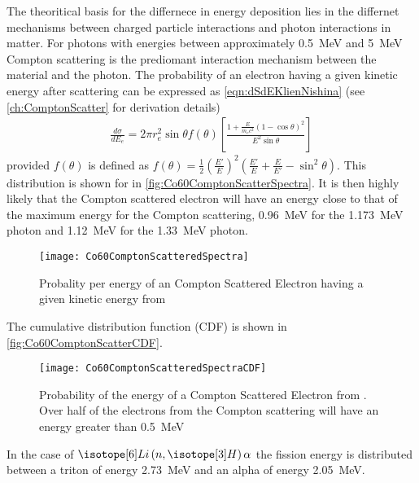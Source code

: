The theoritical basis for the differnece in energy deposition lies in the differnet mechanisms between charged particle interactions and photon interactions in matter.
For photons with energies between approximately \SI{0.5}{\MeV} and \SI{5}{\MeV} Compton scattering is the prediomant interaction mechanism between the material and the photon.
The probability of an electron having a given kinetic energy after scattering can be expressed as \autoref{eqn:dSdEKlienNishina} (see \autoref{ch:ComptonScatter} for derivation details)
\begin{align}
  \label{eqn:dSdEKleinNishina}
\frac{d\sigma}{dE_e} = 2\pi r_e^2 \sin \theta f(\theta)\left [ \frac{1+\frac{E}{m_e c^2}\left(1-\cos\theta \right)^2}{E^2 \sin \theta} \right ]
\end{align}
provided  $f(\theta)$ is defined as $f(\theta) = \frac{1}{2}\left(\frac{E'}{E}\right)^2 \left(\frac{E'}{E} + \frac{E}{E'}-\sin^2\theta\right)$.
This distribution is shown for  in \autoref{fig:Co60ComptonScatterSpectra}.
It is then highly likely that the Compton scattered electron will have an energy close to that of the maximum energy for the Compton scattering, \SI{0.96}{\MeV} for the \SI{1.173}{\MeV} photon and \SI{1.12}{\MeV} for the \SI{1.33}{\MeV} photon.
\begin{figure}
  \centering
  \texttt{[image: Co60ComptonScatteredSpectra]}
  \caption[Gamma (Co-60) Compton Scattered Spectra]{Probality per energy of an Compton Scattered Electron having a given kinetic energy from }
  \label{fig:Co60ComptonScatterSpectra}
\end{figure}
The cumulative distribution function (CDF) is shown in \autoref{fig:Co60ComptonScatterCDF}.
\begin{figure}
  \centering
  \texttt{[image: Co60ComptonScatteredSpectraCDF]}
  \caption[Gamma (Co-60) Compton Scattered CDF]{Probability of the energy of a Compton Scattered Electron from . Over half of the electrons from the Compton scattering will have an energy greater than \SI{0.5}{\MeV}}
  \label{fig:Co60ComptonScatterCDF}
\end{figure}
In the case of $\iso[6]{Li}\left(n,\iso[3]{H}\right)\alpha$ the fission energy is distributed between a triton of energy \SI{2.73}{\mega\eV} and an alpha of energy \SI{2.05}{\mega\eV}.
